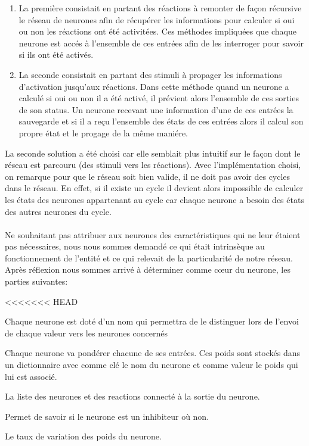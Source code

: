 \begin{enumerate}
  \item La première consistait en partant des réactions à remonter de façon
    récursive le réseau de neurones afin de récupérer les informations pour
    calculer si oui ou non les réactions ont été activitées. Ces méthodes impliquées
    que chaque neurone est accés à l'ensemble de ces entrées afin de les
    interroger pour savoir si ils ont été activés.
  \item La seconde consistait en partant des stimuli à propager les informations
    d'activation jusqu'aux réactions. Dans cette méthode quand un neurone a calculé
    si oui ou non il a été activé, il prévient alors l'ensemble de ces sorties de
    son status. Un neurone recevant une information d'une de ces entrées la
    sauvegarde et si il a reçu l'ensemble des états de ces entrées alors il calcul
    son propre état et le progage de la même maniére.
\end{enumerate}

La seconde solution a été choisi car elle semblait plus intuitif sur le
façon dont le réseau est parcouru (des stimuli vers les réactions). Avec
l'implémentation choisi, on remarque pour que le réseau soit bien valide,
il ne doit pas avoir des cycles dans le réseau. En effet, si il existe un
cycle il devient alors impossible de calculer les états des neurones
appartenant au cycle car chaque neurone a besoin des états des autres neurones du
cycle.

\paragraph{}
Ne souhaitant pas attribuer aux neurones des caractéristiques qui ne leur étaient
pas nécessaires, nous nous sommes demandé ce qui était intrinsèque au
fonctionnement de l'entité et ce qui relevait de la particularité de notre
réseau. Après réflexion nous sommes arrivé à déterminer comme cœur du neurone, les
parties suivantes:\\

\begin{description}
<<<<<<< HEAD
  \item[Nom] Chaque neurone est doté d'un nom qui permettra de le distinguer
    lors de l'envoi de chaque valeur vers les neurones concernés
  \item[Poids] Chaque neurone va pondérer chacune de ses entrées. Ces poids
    sont stockés dans un dictionnaire avec comme clé le nom du neurone et
    comme valeur le poids qui lui est associé.
  \item[Sorties] La liste des neurones et des reactions connecté à la sortie
    du neurone.
  \item[Inhibiteur] Permet de savoir si le neurone est un inhibiteur où non.
  \item[Taux d'apprentissage] Le taux de variation des poids du neurone.
\end{description}

\paragraph{}


